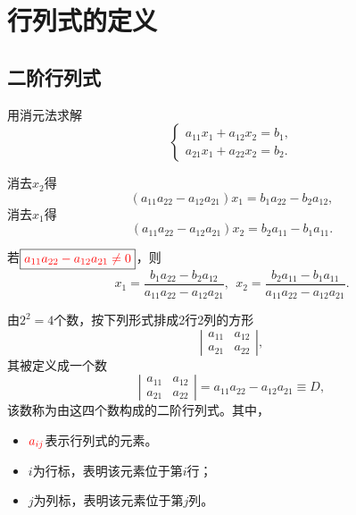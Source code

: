 \section{行列式的定义}
\subsection{二阶行列式}

\begin{frame}
 
\begin{li}
  用消元法求解
  $$
  \left \lbrace
    \begin{array}{l}
      a_{11} x_1 + a_{12} x_2 = b_1, \\[0.2cm]
      a_{21} x_1 + a_{22} x_2 = b_2.
    \end{array}
  \right.
  $$
\end{li}  
\pause 

\begin{jie}
消去$x_2$得
$$
(a_{11}a_{22}-a_{12}a_{21})x_1 = b_1 a_{22} - b_2 a_{12},
$$
消去$x_1$得
$$
(a_{11}a_{22}-a_{12}a_{21})x_2 = b_2 a_{11} - b_1 a_{11}.
$$
\pause  

若$\boxed{\textcolor{red}{a_{11}a_{22}-a_{12}a_{21}\ne0}}$，则
$$
x_1 = \frac{b_1 a_{22} - b_2 a_{12}}{a_{11}a_{22}-a_{12}a_{21}}, \ \
x_2 = \frac{b_2 a_{11} - b_1 a_{11}}{a_{11}a_{22}-a_{12}a_{21}}.
$$
\end{jie}

\end{frame}

\begin{frame}
%
\begin{dingyi}[二阶行列式]
  由$2^2=4$个数，按下列形式排成2行2列的方形
  $$
  \left|
    \begin{array}{cc}
      a_{11} & a_{12} \\[0.2cm]
      a_{21} & a_{22} 
    \end{array}
  \right|,
  $$
  其被定义成一个数
  $$
  \left|
    \begin{array}{cc}
      a_{11} & a_{12} \\[0.2cm]
      a_{21} & a_{22} 
    \end{array}
  \right| = a_{11}a_{22} - a_{12}a_{21} \equiv D,
  $$
  该数称为由这四个数构成的二阶行列式。其中，
  \begin{itemize}
  	\item $\textcolor{red}{a_{ij}}$表示行列式的元素。
  	\item $i$为行标，表明该元素位于第$i$行；
  	\item $j$为列标，表明该元素位于第$j$列。
  \end{itemize}
  
\end{dingyi}
\end{frame}

